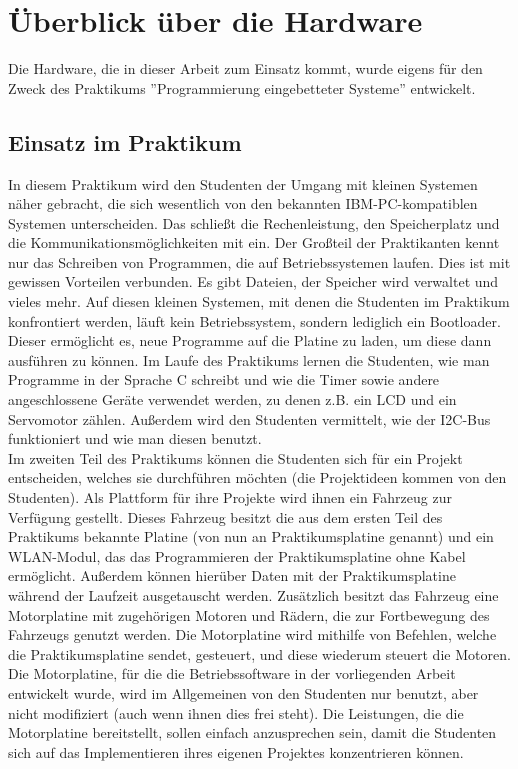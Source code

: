 \chapter{Überblick über die Hardware}
Die Hardware, die in dieser Arbeit zum Einsatz kommt, wurde eigens für den Zweck des Praktikums
''Programmierung eingebetteter Systeme'' entwickelt.

\section{Einsatz im Praktikum}
In diesem Praktikum wird den Studenten der
Umgang mit kleinen Systemen näher gebracht, die sich wesentlich von den bekannten IBM-PC-kompatiblen
Systemen unterscheiden. Das schließt die Rechenleistung, den Speicherplatz und die
Kommunikationsmöglichkeiten mit ein. 
Der Großteil der Praktikanten kennt nur das Schreiben von Programmen, die auf Betriebssystemen laufen.
Dies ist mit gewissen Vorteilen verbunden. Es gibt
Dateien, der Speicher wird verwaltet und vieles mehr. Auf diesen kleinen Systemen, mit denen die Studenten im
Praktikum konfrontiert werden, läuft kein Betriebssystem, sondern lediglich ein Bootloader. Dieser
ermöglicht es, neue Programme auf die Platine zu laden, um diese dann ausführen zu können.
Im Laufe des Praktikums lernen die Studenten, wie man Programme in der Sprache C schreibt und wie die Timer
sowie andere angeschlossene Geräte verwendet werden, zu denen z.B. ein LCD und ein Servomotor zählen.
Außerdem wird den Studenten vermittelt, wie der I2C-Bus funktioniert und wie man diesen benutzt.\\
Im zweiten Teil des Praktikums können die Studenten sich für ein Projekt entscheiden,
welches sie durchführen möchten (die Projektideen kommen von den Studenten).
Als Plattform für ihre Projekte wird ihnen ein Fahrzeug zur Verfügung gestellt. Dieses
Fahrzeug besitzt die aus dem ersten Teil des Praktikums bekannte Platine (von nun an
Praktikumsplatine genannt) und ein WLAN-Modul, das das Programmieren der Praktikumsplatine
ohne Kabel ermöglicht. Außerdem können hierüber Daten mit der Praktikumsplatine während
der Laufzeit ausgetauscht werden. Zusätzlich besitzt das Fahrzeug eine Motorplatine mit
zugehörigen Motoren und Rädern, die zur Fortbewegung des Fahrzeugs genutzt werden. Die
Motorplatine wird mithilfe von Befehlen, welche die Praktikumsplatine sendet, gesteuert, und
diese wiederum steuert die Motoren.\\
Die Motorplatine, für die die Betriebssoftware in der vorliegenden Arbeit entwickelt wurde, wird
im Allgemeinen von den Studenten nur benutzt, aber nicht modifiziert (auch wenn ihnen dies
frei steht). Die Leistungen, die die Motorplatine bereitstellt, 
sollen einfach anzusprechen sein, damit die Studenten sich auf das Implementieren
ihres eigenen Projektes konzentrieren können.\\

